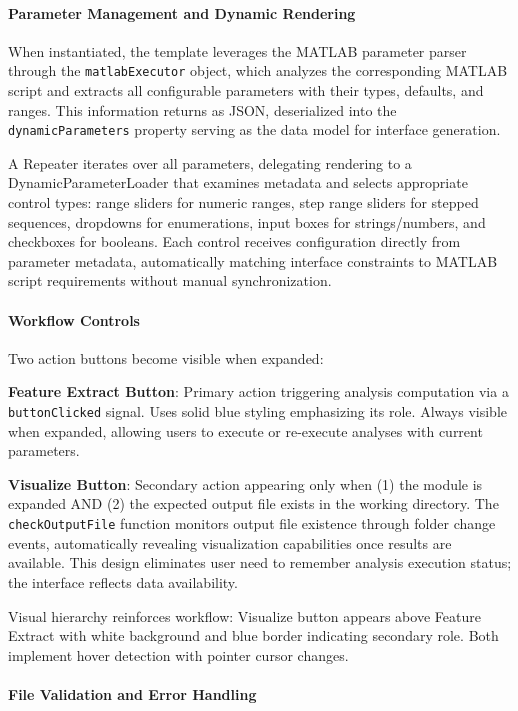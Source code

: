 \documentclass[12pt]{report}
\begin{document}
\paragraph{Parameter Management and Dynamic Rendering}\mbox{}

When instantiated, the template leverages the MATLAB parameter parser through the \verb|matlabExecutor| object, which analyzes the corresponding MATLAB script and extracts all configurable parameters with their types, defaults, and ranges. This information returns as JSON, deserialized into the \verb|dynamicParameters| property serving as the data model for interface generation.

A Repeater iterates over all parameters, delegating rendering to a DynamicParameterLoader that examines metadata and selects appropriate control types: range sliders for numeric ranges, step range sliders for stepped sequences, dropdowns for enumerations, input boxes for strings/numbers, and checkboxes for booleans. Each control receives configuration directly from parameter metadata, automatically matching interface constraints to MATLAB script requirements without manual synchronization.

\paragraph{Workflow Controls}\mbox{}

Two action buttons become visible when expanded:

\textbf{Feature Extract Button}: Primary action triggering analysis computation via a \verb|buttonClicked| signal. Uses solid blue styling emphasizing its role. Always visible when expanded, allowing users to execute or re-execute analyses with current parameters.

\textbf{Visualize Button}: Secondary action appearing only when (1) the module is expanded AND (2) the expected output file exists in the working directory. The \verb|checkOutputFile| function monitors output file existence through folder change events, automatically revealing visualization capabilities once results are available. This design eliminates user need to remember analysis execution status; the interface reflects data availability.

Visual hierarchy reinforces workflow: Visualize button appears above Feature Extract with white background and blue border indicating secondary role. Both implement hover detection with pointer cursor changes.

\paragraph{File Validation and Error Handling}\mbox{}
\end{document}
